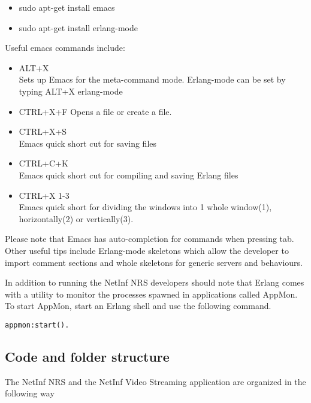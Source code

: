 \begin{itemize}
\item sudo apt-get install emacs
\item sudo apt-get install erlang-mode
\end{itemize}

Useful emacs commands include:

\begin{itemize}
\item ALT+X \\
Sets up Emacs for the meta-command mode. Erlang-mode can be set by typing
ALT+X erlang-mode
\item CTRL+X+F
Opens a file or create a file. 
\item CTRL+X+S \\
Emacs quick short cut for saving files
\item CTRL+C+K \\
Emacs quick short cut for compiling and saving Erlang files
\item CTRL+X 1-3 \\
Emacs quick short for dividing the windows into 1 whole window(1), horizontally(2) or vertically(3).
\end{itemize}

Please note that Emacs has auto-completion for commands when pressing tab. Other useful tips include Erlang-mode 
skeletons which allow the developer to import comment sections and whole skeletons for generic servers and behaviours.

In addition to running the NetInf NRS developers should note that Erlang comes with a utility to monitor the processes 
spawned in applications called AppMon. To start AppMon, start an Erlang shell and use the following command.

\begin{verbatim}
appmon:start(). 
\end{verbatim}


\subsection {Code and folder structure}

The NetInf NRS and the NetInf Video Streaming application are organized in the following way

